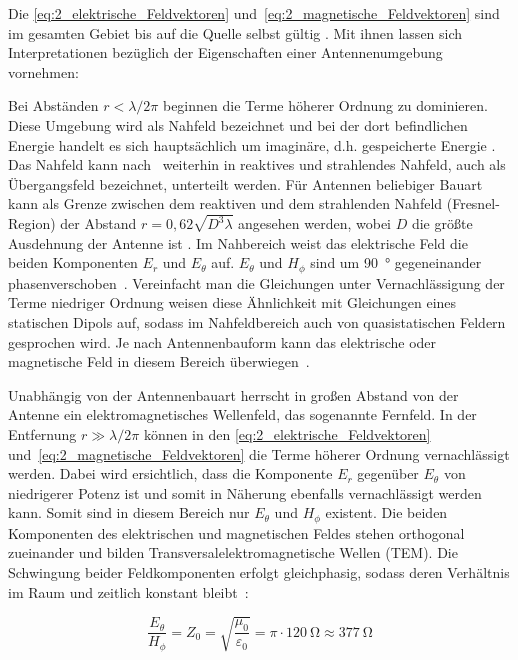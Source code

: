 Die \Gleichungen\eqref{eq:2_elektrische_Feldvektoren} und~\eqref{eq:2_magnetische_Feldvektoren} sind im gesamten Gebiet bis auf die Quelle selbst gültig \cite{Antenna_Theory}. Mit ihnen lassen sich Interpretationen bezüglich der Eigenschaften einer Antennenumgebung vornehmen:
\par
\vspace{\linespace}
Bei Abständen $r< \lambda / 2\pi$ beginnen die Terme höherer Ordnung zu dominieren. Diese Umgebung wird als Nahfeld bezeichnet und bei der dort befindlichen Energie handelt es sich hauptsächlich um imaginäre, d.h. gespeicherte Energie \cite{Antenna_Theory}. Das Nahfeld kann nach~\cite{Bundesnetzagentur_Glossar_Nahfeld} weiterhin in reaktives und strahlendes Nahfeld, auch als Übergangsfeld bezeichnet, unterteilt werden. Für Antennen beliebiger Bauart kann als Grenze zwischen dem reaktiven und dem strahlenden Nahfeld (Fresnel-Region) der Abstand \mbox{$r=0,62 \sqrt{D^3\lambda}$} angesehen werden, wobei $D$ die größte Ausdehnung der Antenne ist \cite{Antenna_Theory}. Im Nahbereich weist das elektrische Feld die beiden Komponenten $E_r$ und $E_{\theta}$ auf. $E_\theta$ und $H_\phi$ sind um \SI{90}{\degree} gegeneinander phasenverschoben~\cite{EM_Schirmung}. Vereinfacht man die Gleichungen unter Vernachlässigung der Terme niedriger Ordnung weisen diese Ähnlichkeit mit Gleichungen eines statischen Dipols auf, sodass im Nahfeldbereich auch von quasistatischen Feldern gesprochen wird. Je nach Antennenbauform kann das elektrische oder magnetische Feld in diesem Bereich überwiegen~\cite{EMV}. 
\par
\vspace{\linespace}
Unabhängig von der Antennenbauart herrscht in großen Abstand von der Antenne ein elektromagnetisches Wellenfeld, das sogenannte Fernfeld. In der Entfernung $r\gg \lambda / 2\pi$ können in den \Gleichungen\eqref{eq:2_elektrische_Feldvektoren} und~\eqref{eq:2_magnetische_Feldvektoren} die Terme höherer Ordnung vernachlässigt werden. Dabei wird ersichtlich, dass die Komponente $E_r$ gegenüber $E_\theta$ von niedrigerer Potenz ist und somit in Näherung ebenfalls vernachlässigt werden kann. Somit sind in diesem Bereich nur $E_\theta$ und $H_\phi$ existent. Die beiden Komponenten des elektrischen und magnetischen Feldes stehen orthogonal zueinander und bilden Transversalelektromagnetische Wellen (TEM). Die Schwingung beider Feldkomponenten erfolgt gleichphasig, sodass deren Verhältnis im Raum und zeitlich konstant bleibt~\cite{EMV}:

\begin{equation}
    \frac{E_{\theta}}{H_{\phi}} = Z_0 = \sqrt{\frac{\mu_0}{\varepsilon_0}} = \pi \cdot \SI{120}{\ohm} \approx \SI{377}{\ohm}
\end{equation}


